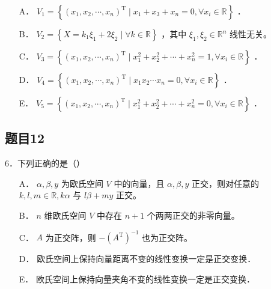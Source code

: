 \documentclass{article}
\begin{document}
\begin{itemize}
  \item[A．] \(V_{1}=\left\{\left(x_{1}, x_{2}, \cdots, x_{n}\right)^{\mathrm{T}} \mid x_{1}+x_{3}+x_{n}=0, \forall x_{i} \in \mathbb{R}\right\}\) ．
  \item[B．] \(V_{2}=\left\{X=k_{1} \xi_{1}+2 \xi_{2} \mid \forall k \in \mathbb{R}\right\}\) ，其中 \(\xi_{1}, \xi_{2} \in \mathbb{R}^{n}\) 线性无关。
  \item[C．] \(V_{3}=\left\{\left(x_{1}, x_{2}, \cdots, x_{n}\right)^{\mathrm{T}} \mid x_{1}^{2}+x_{2}^{2}+\cdots+x_{n}^{2}=1, \forall x_{i} \in \mathbb{R}\right\}\) ．
  \item[D．] \(V_{4}=\left\{\left(x_{1}, x_{2}, \cdots, x_{n}\right)^{\mathrm{T}} \mid x_{1} x_{2} \cdots x_{n}=0, \forall x_{i} \in \mathbb{R}\right\}\) ．
  \item[E．] \(V_{5}=\left\{\left(x_{1}, x_{2}, \cdots, x_{n}\right)^{\mathrm{T}} \mid x_{1}^{2}+x_{2}^{2}+\cdots+x_{n}^{2}=0, \forall x_{i} \in \mathbb{R}\right\}\) ．
\end{itemize}

\subsection{题目12}
6．下列正确的是（）

\begin{itemize}
  \item[A．] \(\alpha, \beta, y\) 为欧氏空间 \(V\) 中的向量，且 \(\alpha, \beta, y\) 正交，则对任意的 \(k, l, m \in \mathbb{R}, k \alpha\) 与 \(l \beta+m y\) 正交。
  \item[B．] \(n\) 维欧氏空间 \(V\) 中存在 \(n+1\) 个两两正交的非零向量。
  \item[C．] \(A\) 为正交阵，则 \(-\left(A^{\mathrm{T}}\right)^{-1}\) 也为正交阵。
  \item[D．] 欧氏空间上保持向量距离不变的线性变换一定是正交变换．
  \item[E．] 欧氏空间上保持向量夹角不变的线性变换一定是正交变换．
\end{itemize}
\end{document}

